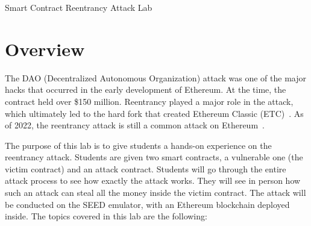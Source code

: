 
\newcommand{\commonfolder}{../../common-files}







\newcommand{\pointupright}[1]{\ding{218} \textbf{\texttt{#1}}}

\usepackage{hyperref}





\begin{center}
{\LARGE Smart Contract Reentrancy Attack Lab}
\end{center}




\section{Overview} 

The DAO (Decentralized Autonomous Organization) attack was one of the major hacks that
occurred in the early development of Ethereum. At the time, the contract held over \$150
million. Reentrancy played a major role in the attack, which ultimately led to the hard fork
that created Ethereum Classic (ETC)~\cite{MasteringEthereum,DAO}. 
As of 2022, the reentrancy attack is still a common attack on Ethereum~\cite{collection}.


The purpose of this lab is to give students a hands-on experience on
the reentrancy attack. Students are given two smart contracts, 
a vulnerable one (the victim contract) and an attack contract. 
Students will go through the entire attack process
to see how exactly the attack works. They will see in person how such an 
attack can steal all the money inside the victim contract.  The
attack will be conducted on the SEED emulator, with 
an Ethereum blockchain deployed inside. 
The topics covered in this lab are the following:

